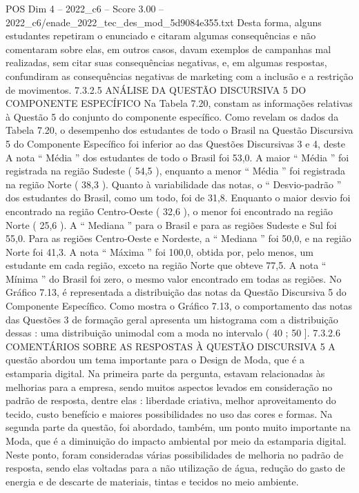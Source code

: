 \begin{textsample}{POS Dim 4 – 2022\_c6 – Score 3.00 – 2022\_c6/enade\_2022\_tec\_des\_mod\_5d9084e355.txt}
Desta forma, alguns estudantes repetiram o enunciado e citaram algumas consequências e não comentaram sobre elas, em outros casos, davam exemplos de campanhas mal realizadas, sem citar suas consequências negativas, e, em algumas respostas, confundiram as consequências negativas de marketing com a inclusão e a restrição de movimentos. 7.3.2.5 ANÁLISE DA QUESTÃO DISCURSIVA 5 DO COMPONENTE ESPECÍFICO Na Tabela 7.20, constam as informações relativas à Questão 5 do conjunto do componente específico.
Como revelam os dados da Tabela 7.20, o desempenho dos estudantes de todo o Brasil na Questão Discursiva 5 do Componente Específico foi inferior ao das Questões Discursivas 3 e 4, deste A nota “ Média ” dos estudantes de todo o Brasil foi 53,0.
A maior “ Média ” foi registrada na região Sudeste ( 54,5 ), enquanto a menor “ Média ” foi registrada na região Norte ( 38,3 ).
Quanto à variabilidade das notas, o “ Desvio-padrão ” dos estudantes do Brasil, como um todo, foi de 31,8.
Enquanto o maior desvio foi encontrado na região Centro-Oeste ( 32,6 ), o menor foi encontrado na região Norte ( 25,6 ).
A “ Mediana ” para o Brasil e para as regiões Sudeste e Sul foi 55,0.
Para as regiões Centro-Oeste e Nordeste, a “ Mediana ” foi 50,0, e na região Norte foi 41,3.
A nota “ Máxima ” foi 100,0, obtida por, pelo menos, um estudante em cada região, exceto na região Norte que obteve 77,5.
A nota “ Mínima ” do Brasil foi zero, o mesmo valor encontrado em todas as regiões.
No Gráfico 7.13, é representada a distribuição das notas da Questão Discursiva 5 do Componente Específico.
Como mostra o Gráfico 7.13, o comportamento das notas das Questões 3 de formação geral apresenta um histograma com a distribuição dessas : uma distribuição unimodal com a moda no intervalo ( 40 ; 50 ]. 7.3.2.6 COMENTÁRIOS SOBRE AS RESPOSTAS À QUESTÃO DISCURSIVA 5 A questão abordou um tema importante para o Design de Moda, que é a estamparia digital.
Na primeira parte da pergunta, estavam relacionadas às melhorias para a empresa, sendo muitos aspectos levados em consideração no padrão de resposta, dentre elas : liberdade criativa, melhor aproveitamento do tecido, custo benefício e maiores possibilidades no uso das cores e formas.
Na segunda parte da questão, foi abordado, também, um ponto muito importante na Moda, que é a diminuição do impacto ambiental por meio da estamparia digital.
Neste ponto, foram consideradas várias possibilidades de melhoria no padrão de resposta, sendo elas voltadas para a não utilização de água, redução do gasto de energia e de descarte de materiais, tintas e tecidos no meio ambiente.

\end{textsample}
